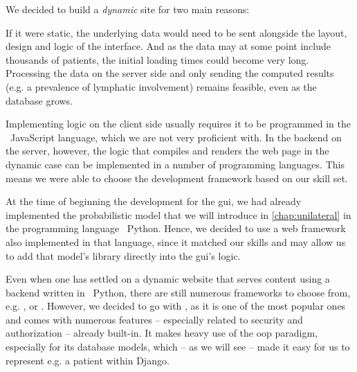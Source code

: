 \documentclass[\relativeRoot/main.tex]{subfiles}
\begin{document}
We decided to build a \emph{dynamic} site for two main reasons: 
\begin{enumerate*}[label={(\arabic*)}]
    \item If it were static, the underlying data would need to be sent alongside the layout, design and logic of the interface. And as the data may at some point include thousands of patients, the initial loading times could become very long. Processing the data on the server side and only sending the computed results (e.g. a prevalence of lymphatic involvement) remains feasible, even as the database grows.
    \item Implementing logic on the client side usually requires it to be programmed in the ~JavaScript language, which we are not very proficient with. In the backend on the server, however, the logic that compiles and renders the web page in the dynamic case can be implemented in a number of programming languages. This means we were able to choose the development framework based on our skill set.
\end{enumerate*}

At the time of beginning the development for the \gls{gui}, we had already implemented the probabilistic model that we will introduce in \cref{chap:unilateral} in the programming language ~Python. Hence, we decided to use a web framework also implemented in that language, since it matched our skills and may allow us to add that model's library directly into the \gls{gui}'s logic.

Even when one has settled on a dynamic website that serves content using a backend written in ~Python, there are still numerous frameworks to choose from, e.g. ,  or . However, we decided to go with  \cite{noauthor_django_2022}, as it is one of the most popular ones and comes with numerous features -- especially related to security and authorization -- already built-in. It makes heavy use of the \acrlong{oop} paradigm, especially for its database models, which -- as we will see -- made it easy for us to represent e.g. a patient within Django.
\end{document}
